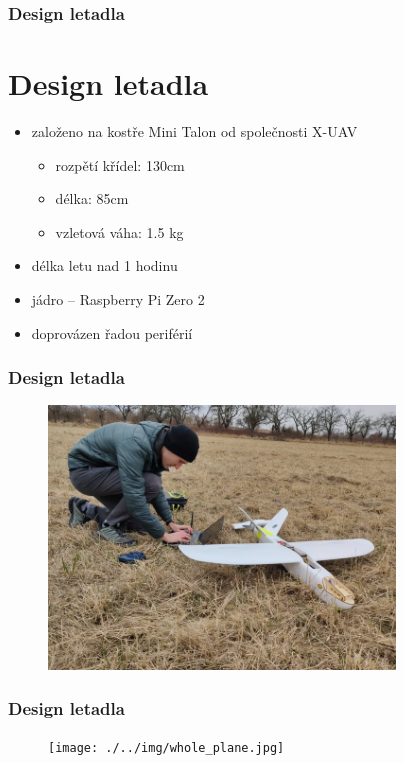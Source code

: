 \documentclass[aspectratio=43]{beamer}
\begin{document}
\begin{frame}[fragile]
	\frametitle{Design letadla}
	\section{Design letadla}
	\begin{itemize}
		\item založeno na kostře Mini Talon od společnosti X-UAV
			\begin{itemize}
				\item rozpětí křídel: 130cm
				\item délka: 85cm
				\item vzletová váha: 1.5 kg
			\end{itemize}
		\item délka letu nad 1 hodinu
		\item jádro -- Raspberry Pi Zero 2
		\item doprovázen řadou periférií
	\end{itemize}
\end{frame}

\begin{frame}[fragile]
	\frametitle{Design letadla}
	\begin{figure}[h]
		\centering
		\includegraphics[height=7cm]{./../img/photo1.jpg}
	\end{figure}
\end{frame}

\begin{frame}[fragile]
	\frametitle{Design letadla}
	\begin{figure}[h]
		\centering
		\texttt{[image: ./../img/whole\_plane.jpg]}
	\end{figure}
\end{frame}
\end{document}
